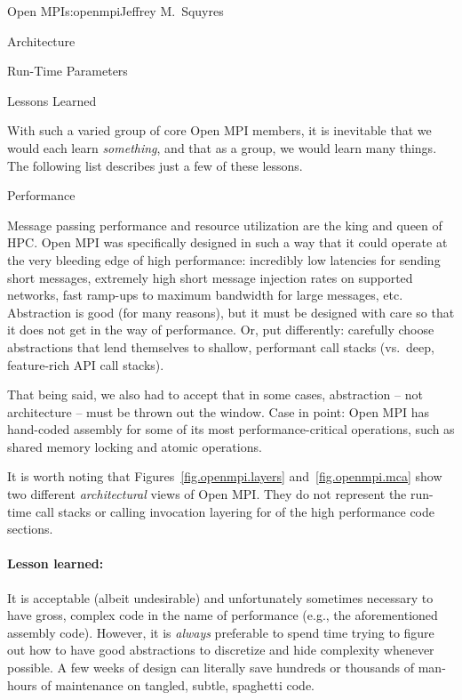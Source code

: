 \begin{aosachapter}{Open MPI}{s:openmpi}{Jeffrey M.\ Squyres}
\begin{aosasect1}{Architecture}
\begin{aosasect2}{Run-Time Parameters}
\end{aosasect2}

\end{aosasect1}


\begin{aosasect1}{Lessons Learned}

With such a varied group of core Open MPI members, it is inevitable that
we would each learn \emph{something}, and that as a group, we would
learn many things.  The following list describes just a few of these
lessons.


\begin{aosasect2}{Performance}

Message passing performance and resource utilization are the king
and queen of HPC.
%
Open MPI was specifically designed in such a way that it could operate
at the very bleeding edge of high performance: incredibly low
latencies for sending short messages, extremely high short message
injection rates on supported networks, fast ramp-ups to maximum
bandwidth for large messages, etc.
%
Abstraction is good (for many reasons), but it must be designed with
care so that it does not get in the way of performance.  Or, put
differently: carefully choose abstractions that lend themselves to
shallow, performant call stacks (vs.\ deep, feature-rich API call
stacks).

That being said, we also had to accept that in some cases, abstraction
-- not architecture -- must be thrown out the window.  Case in point:
Open MPI has hand-coded assembly for some of its most
performance-critical operations, such as shared memory locking and
atomic operations.

It is worth noting that Figures~\ref{fig.openmpi.layers}
and~\ref{fig.openmpi.mca} show two different \emph{architectural} views
of Open MPI.
%
They do not represent the run-time call stacks or calling invocation
layering for of the high performance code sections.


\paragraph{Lesson learned:} 

It is acceptable (albeit undesirable) and unfortunately sometimes
necessary to have gross, complex code in the name of performance
(e.g., the aforementioned assembly code).
%
However, it is \emph{always} preferable to spend time trying to figure
out how to have good abstractions to discretize and hide complexity
whenever possible.  A few weeks of design can literally save hundreds
or thousands of man-hours of maintenance on tangled, subtle, spaghetti
code.


\end{aosasect2}
\end{aosasect1}
\end{aosachapter}

